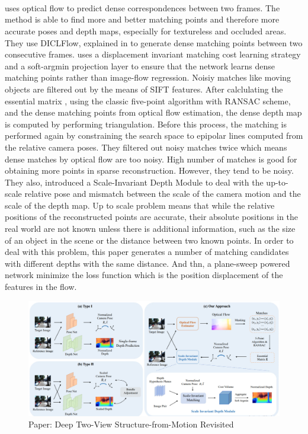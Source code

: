 \documentclass[11pt]{article}
\begin{document}
    \paragraph{~\cite{wang2021deep}} uses optical flow to predict dense correspondences between two frames. The method is
    able to find more and better matching points and therefore more accurate poses and depth maps, especially for
    textureless and occluded areas. They use DICLFlow, explained in \cite{wang2020displacement} to generate
    dense matching points between two consecutive frames. \cite{wang2020displacement} uses a displacement invariant matching
    cost learning strategy and a soft-argmin projection layer to ensure that the network learns dense matching
    points rather than image-flow regression. Noisiy matches like moving
    objects are filtered out by the means of SIFT features. After calclulating the essential matrix , using
    the classic five-point algorithm with RANSAC scheme, and the dense matching points from optical flow estimation,
    the dense depth map is computed by performing triangulation. Before this process, the matching is performed
    again by constraining the search space to epipolar lines computed from the relative camera poses. They filtered
    out noisy matches twice which means dense matches by optical flow are too noisy. High number of matches is good
    for obtaining more points in sparse reconstruction. However, they tend to be noisy. They also,
    introduced a Scale-Invariant Depth Module to deal with the up-to-scale relative pose and mismatch between the
    scale of the camera motion and the scale of the depth map. Up to scale problem means that while the
    relative positions of the reconstructed points are accurate, their absolute positions in the real world
    are not known unless there is additional information, such as the size of an object in the scene or the
    distance between two known points. In order to deal with this problem, this paper generates a number of matching
    candidates with different depths with the same distance. And thn, a plane-sweep powered network minimize
    the loss function which is the position displacement of the features in the flow.

    \begin{figure}
    \caption{Paper: Deep Two-View Structure-from-Motion Revisited}
    \centering
    \includegraphics[width=\textwidth,height=\textheight,keepaspectratio]{images/deep_two_sfm.jpg}
    \end{figure}
\end{document}
